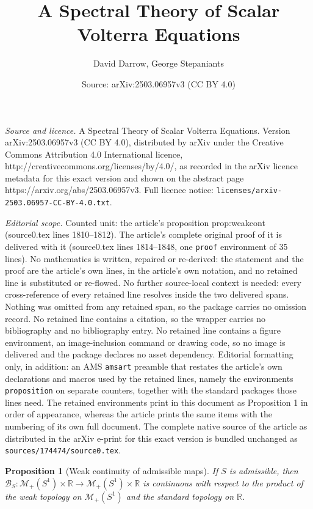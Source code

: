 \documentclass[10pt,a4paper]{amsart}
\title{A Spectral Theory of Scalar Volterra Equations}
\author{David Darrow, George Stepaniants}
\date{Source: arXiv:2503.06957v3 (CC BY 4.0)}
\newtheorem{proposition}{Proposition}
\newcommand{\RR}{\mathbb R}
\newcommand{\cB}{\mathcal B}
\newcommand{\cM}{\mathcal M}
\begin{document}
\maketitle

\noindent\emph{Source and licence.} A Spectral Theory of Scalar Volterra Equations. Version arXiv:2503.06957v3 (CC BY 4.0), distributed by arXiv under the Creative Commons Attribution 4.0 International licence, http://creativecommons.org/licenses/by/4.0/, as recorded in the arXiv licence metadata for this exact version and shown on the abstract page https://arxiv.org/abs/2503.06957v3. Full licence notice: \texttt{licenses/arxiv-2503.06957-CC-BY-4.0.txt}.\par\smallskip

\noindent\textit{Editorial scope.} Counted unit: the article's proposition prop:weakcont (source0.tex lines 1810--1812). The article's complete original proof of it is delivered with it (source0.tex lines 1814--1848, one \texttt{proof} environment of 35 lines). No mathematics is written, repaired or re-derived: the statement and the proof are the article's own lines, in the article's own notation, and no retained line is substituted or re-flowed.  No further source-local context is needed: every cross-reference of every retained line resolves inside the two delivered spans.  Nothing was omitted from any retained span, so the package carries no omission record.  No retained line contains a citation, so the wrapper carries no bibliography and no bibliography entry.  No retained line contains a figure environment, an image-inclusion command or drawing code, so no image is delivered and the package declares no asset dependency.  Editorial formatting only, in addition: an AMS \texttt{amsart} preamble that restates the article's own declarations and macros used by the retained lines, namely the environments \texttt{proposition} on separate counters, together with the standard packages those lines need.  The retained environments print in this document as Proposition 1 in order of appearance, whereas the article prints the same items with the numbering of its own full document.  The complete native source of the article as distributed in the arXiv e-print for this exact version is bundled unchanged as \texttt{sources/174474/source0.tex}.
\begin{proposition}[Weak continuity of admissible maps]\label{prop:weakcont}
    If $S$ is admissible, then $\cB_{S}:\cM_+(S^1)\times\RR\to\cM_+(S^1)\times\RR$ is continuous with respect to the product of the weak topology on $\cM_+(S^1)$ and the standard topology on $\RR$.
\end{proposition}
\end{document}

